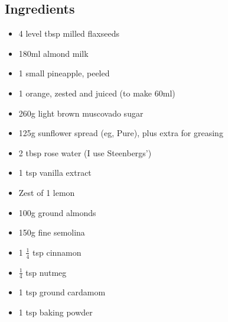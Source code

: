\documentclass{book}
\begin{document}
\subsection*{Ingredients}
\begin{itemize}
\item 4 level tbsp milled flaxseeds
\item 180ml almond milk
\item 1 small pineapple, peeled
\item 1 orange, zested and juiced (to make 60ml)
\item 260g light brown muscovado sugar
\item 125g sunflower spread (eg, Pure), plus extra for greasing
\item 2 tbsp rose water (I use Steenbergs’)
\item 1 tsp vanilla extract
\item Zest of 1 lemon
\item 100g ground almonds
\item 150g fine semolina
\item 1 $\frac{1}{4}$ tsp cinnamon
\item $\frac{1}{4}$ tsp nutmeg
\item 1 tsp ground cardamom
\item 1 tsp baking powder
\end{itemize}
\end{document}
